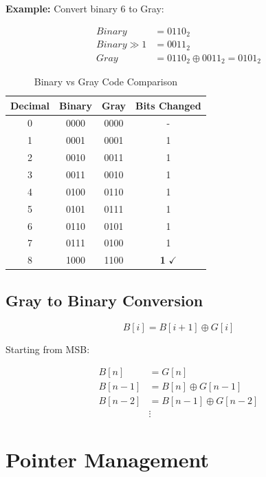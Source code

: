 \documentclass[12pt,a4paper]{article}
\begin{document}
\textbf{Example:} Convert binary 6 to Gray:

\begin{align}
Binary &= 0110_2 \\
Binary \gg 1 &= 0011_2 \\
Gray &= 0110_2 \oplus 0011_2 = 0101_2
\end{align}

\begin{table}[h]
\centering
\begin{tabular}{|c|c|c|c|}
\hline
\textbf{Decimal} & \textbf{Binary} & \textbf{Gray} & \textbf{Bits Changed} \\
\hline
0 & 0000 & 0000 & - \\
1 & 0001 & 0001 & 1 \\
2 & 0010 & 0011 & 1 \\
3 & 0011 & 0010 & 1 \\
4 & 0100 & 0110 & 1 \\
5 & 0101 & 0111 & 1 \\
6 & 0110 & 0101 & 1 \\
7 & 0111 & 0100 & 1 \\
8 & 1000 & 1100 & \textbf{1} $\checkmark$ \\
\hline
\end{tabular}
\caption{Binary vs Gray Code Comparison}
\end{table}

\subsection{Gray to Binary Conversion}

\begin{equation}
\boxed{B[i] = B[i+1] \oplus G[i]}
\end{equation}

Starting from MSB:

\begin{align}
B[n] &= G[n] \\
B[n-1] &= B[n] \oplus G[n-1] \\
B[n-2] &= B[n-1] \oplus G[n-2] \\
&\vdots
\end{align}

\section{Pointer Management}
\end{document}
